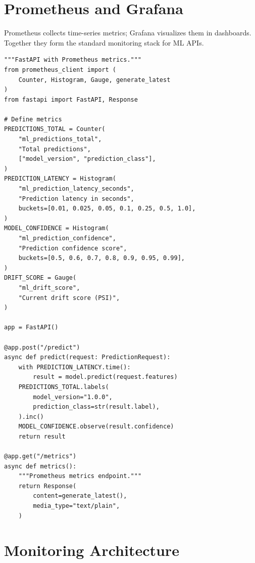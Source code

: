 \section{Prometheus and Grafana}
\label{sec:prometheus-grafana}

Prometheus collects time-series metrics; Grafana visualizes them in
dashboards. Together they form the standard monitoring stack for ML
APIs.

\begin{codeblock}[title=\textbf{Prometheus metrics in FastAPI}]
\begin{verbatim}
"""FastAPI with Prometheus metrics."""
from prometheus_client import (
    Counter, Histogram, Gauge, generate_latest
)
from fastapi import FastAPI, Response

# Define metrics
PREDICTIONS_TOTAL = Counter(
    "ml_predictions_total",
    "Total predictions",
    ["model_version", "prediction_class"],
)
PREDICTION_LATENCY = Histogram(
    "ml_prediction_latency_seconds",
    "Prediction latency in seconds",
    buckets=[0.01, 0.025, 0.05, 0.1, 0.25, 0.5, 1.0],
)
MODEL_CONFIDENCE = Histogram(
    "ml_prediction_confidence",
    "Prediction confidence score",
    buckets=[0.5, 0.6, 0.7, 0.8, 0.9, 0.95, 0.99],
)
DRIFT_SCORE = Gauge(
    "ml_drift_score",
    "Current drift score (PSI)",
)

app = FastAPI()

@app.post("/predict")
async def predict(request: PredictionRequest):
    with PREDICTION_LATENCY.time():
        result = model.predict(request.features)
    PREDICTIONS_TOTAL.labels(
        model_version="1.0.0",
        prediction_class=str(result.label),
    ).inc()
    MODEL_CONFIDENCE.observe(result.confidence)
    return result

@app.get("/metrics")
async def metrics():
    """Prometheus metrics endpoint."""
    return Response(
        content=generate_latest(),
        media_type="text/plain",
    )
\end{verbatim}
\end{codeblock}

\section{Monitoring Architecture}
\label{sec:monitoring-arch}


